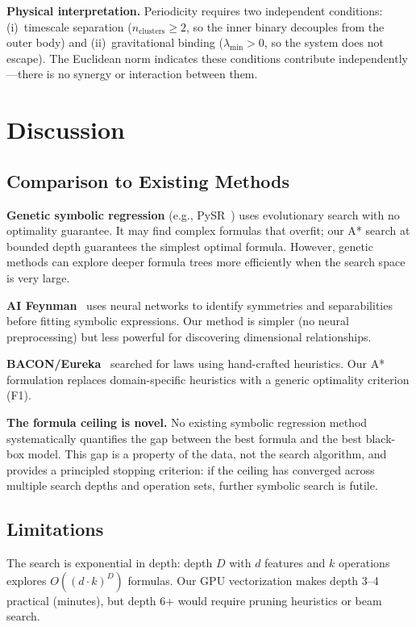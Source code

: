 \documentclass[11pt,a4paper]{article}
\begin{document}
\textbf{Physical interpretation.} Periodicity requires two
independent conditions: (i)~timescale separation
($n_\mathrm{clusters} \geq 2$, so the inner binary decouples from
the outer body) and (ii)~gravitational binding
($\lambda_\mathrm{min} > 0$, so the system does not escape). The
Euclidean norm indicates these conditions contribute independently---there
is no synergy or interaction between them.

\section{Discussion}

\subsection{Comparison to Existing Methods}

\textbf{Genetic symbolic regression} (e.g., PySR~\cite{cranmer2023interpretable})
uses evolutionary search with no optimality guarantee. It may find
complex formulas that overfit; our A* search at bounded depth
guarantees the simplest optimal formula. However, genetic methods
can explore deeper formula trees more efficiently when the search
space is very large.

\textbf{AI Feynman}~\cite{udrescu2020ai} uses neural networks to
identify symmetries and separabilities before fitting symbolic
expressions. Our method is simpler (no neural preprocessing) but
less powerful for discovering dimensional relationships.

\textbf{BACON/Eureka}~\cite{langley1987scientific} searched for
laws using hand-crafted heuristics. Our A* formulation replaces
domain-specific heuristics with a generic optimality criterion (F1).

\textbf{The formula ceiling is novel.} No existing symbolic
regression method systematically quantifies the gap between the
best formula and the best black-box model. This gap is a property
of the data, not the search algorithm, and provides a principled
stopping criterion: if the ceiling has converged across multiple
search depths and operation sets, further symbolic search is futile.

\subsection{Limitations}

The search is exponential in depth: depth $D$ with $d$ features and
$k$ operations explores $O((d \cdot k)^D)$ formulas. Our GPU
vectorization makes depth 3--4 practical (minutes), but depth 6+
would require pruning heuristics or beam search.
\end{document}
